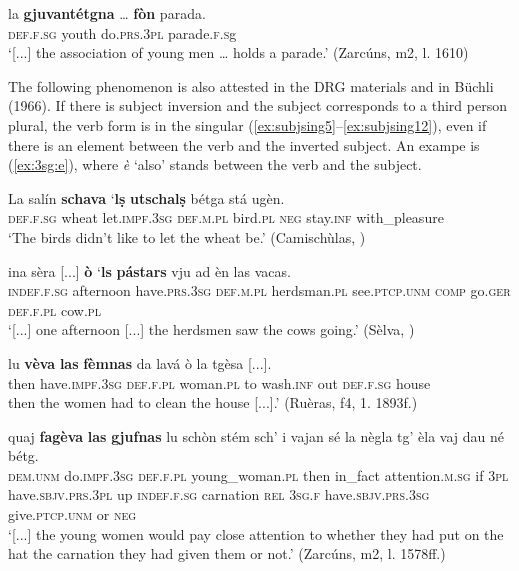 \ea
\label{ex:subjsing4}
\gll    [...] la \textbf{gjuvantétgna} … \textbf{fòn} parada.\\
{} \textsc{def.f.sg} youth {} do.\textsc{prs.3pl} parade.\textsc{f.s}g\\
\glt `[...] the association of young men … holds a parade.' (Zarcúns, m2, l. 1610)
\z

The following phenomenon is also attested in the DRG materials and in Büchli (1966). If there is subject inversion and the subject corresponds to a third person plural, the verb form is in the singular (\ref{ex:subjsing5}--\ref{ex:subjsing12}), even if there is an element between the verb and the inverted subject. An exampe is (\ref{ex:3sg:e}), where \textit{è} `also' stands between the verb and the subject.


\ea
\label{ex:subjsing5}
\gll La salín \textbf{schava} `\textbf{lṣ} \textbf{utschalṣ} bétga stá ugèn.\\
\textsc{def.f.sg} wheat let.\textsc{impf.3sg} \textsc{def.m.pl} bird.\textsc{pl} \textsc{neg} stay.\textsc{inf} with\_pleasure\\
\glt `The birds didn't like to let the wheat be.' (Camischùlas, )
\z

\ea
\label{ex:subjsing6}
\gll [...] ina sèra [...] \textbf{ò} `\textbf{ls} \textbf{pástars} vju ad èn las vacas.\\
{} \textsc{indef.f.sg} afternoon {} have.\textsc{prs.3sg} \textsc{def.m.pl} herdsman.\textsc{pl} see.\textsc{ptcp.unm} \textsc{comp} go.\textsc{ger} \textsc{def.f.pl} cow.\textsc{pl}\\
\glt `[...] one afternoon [...] the herdsmen saw the cows going.' (Sèlva, \citealt[28]{Büchli1966})
\z

\ea
\label{ex:subjsing7}
\gll [...] lu \textbf{vèva} \textbf{las} \textbf{fèmnas} da lavá ò la tgèsa [...].   \\
{} then have.\textsc{impf.3sg} \textsc{def.f.pl} woman.\textsc{pl} to wash.\textsc{inf} out \textsc{def.f.sg} house\\
\glt [...] then the women had to clean the house [...].' (Ruèras, f4, 1. 1893f.)
\z

\ea
\label{ex:subjsing8}
\gll    [...] quaj \textbf{fagèva} \textbf{las} \textbf{gjufnas} lu schòn stém sch’ i vajan sé la nègla tg’ èla vaj dau né bétg.\\
{} \textsc{dem.unm} do.\textsc{impf.3sg} \textsc{def.f.pl} young\_woman.\textsc{pl} then in\_fact attention.\textsc{m.sg} if \textsc{3pl}  have.\textsc{sbjv.prs.3pl} up \textsc{indef.f.sg} carnation \textsc{rel} \textsc{3sg.f} have.\textsc{sbjv.prs.3sg}  give.\textsc{ptcp.unm} or \textsc{neg} \\
\glt `[...] the young women would pay close attention to whether they had put on the hat the carnation they had given them or not.' (Zarcúns, m2, l. 1578ff.)
\z

